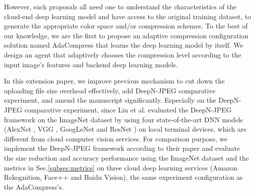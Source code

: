However, such proposals all need one to understand the characteristics of the cloud-end deep learning model and have access to the original training dataset, to generate the appropriate color space and/or compression schemes. To the best of our knowledge, we are the first to propose an adaptive compression configuration solution named AdaCompress \cite{2019adacompress} that learns the deep learning model by itself. We design an agent that adaptively chooses the compression level according to the input image's features and backend deep learning models. 

In this extension paper, we improve previous mechanism to cut down the uploading file size overhead effectively, add DeepN-JPEG comparative experiment, and amend the manuscript significantly. Especially on the DeepN-JPEG comparative experiment, since Liu et al. \cite{DeepN-JPEG} evaluated the DeepN-JPEG framework on the ImageNet dataset by using four state-of-the-art DNN models (AlexNet \cite{AlexNet-krizhevsky2012imagenet}, VGG \cite{VGG-simonyan2014very}, GoogLeNet \cite{GoogleNet-szegedy2015going} and ResNet \cite{ResNet-he2016deep}) on local terminal devices, which are different from cloud computer vision services. For comparison purpose, we implement the DeepN-JPEG framework according to their paper and evaluate the size reduction and accuracy performance using the ImageNet dataset and the metrics in Sec.\ref{subsec:metrics} on three cloud deep learning services (Amazon Rekognition, Face++ and Baidu Vision), the same experiment configuration as the AdaCompress's.

